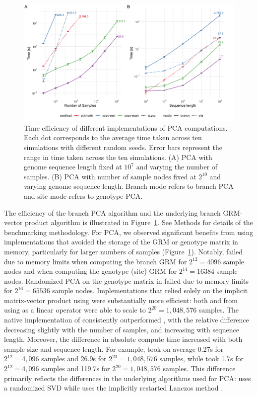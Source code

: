 \begin{figure}
    \centering
    \includegraphics[width=\textwidth]{Figures/Fig2_benchmarking_plot.png}
    \caption{Time efficiency of different implementations of PCA computations.
    Each dot corresponds to the average time taken across ten simulations with different random seeds.
    Error bars represent the range in time taken across the ten simulations.
    (A) PCA with genome sequence length fixed at $10^{7}$ and varying the number of samples.
    (B) PCA with number of sample nodes fixed at $2^{10}$ and varying genome sequence length.
    Branch mode refers to branch PCA and site mode refers to genotype PCA.
    \label{fig:benchmarking}}
\end{figure}

The efficiency of the branch PCA algorithm
and the underlying branch GRM-vector product algorithm is illustrated in
Figure~\ref{fig:benchmarking}. 
See Methods for details of the benchmarking methodology.
For PCA, we observed significant benefits from using implementations that avoided the storage of the GRM or genotype matrix in memory,
particularly for larger numbers of samples (Figure~\ref{fig:benchmarking}).
%
Notably, \tsGRM{} failed due to memory limits
when computing the branch GRM for $2^{12} = 4096$ sample nodes and
when computing the genotype (site) GRM for $2^{14} = 16384$ sample nodes.
%
Randomized PCA on the genotype matrix in \scikitallel{}
failed due to memory limits for $2^{16} = 65536$ sample nodes.
%
Implementations that relied solely on
the implicit matrix-vector product using \tskit{} were substantially more efficient:
%
both \tsPCA{} and \eigsh{} from \scipy{} using \tsGRMv{}
as a linear operator were able to scale to $2^{20} = 1,048,576$ samples.
%
The native implementation of \tsPCA{} consistently outperformed \eigsh{},
with the relative difference decreasing slightly with the number of samples, and increasing with sequence length.
%
Moreover, the difference in absolute compute time increased with both sample size and sequence length.
%
For example, \tsPCA{} took on average
0.27s for $2^{12} = 4,096$ samples and
26.9s for $2^{20} = 1,048,576$ samples,
while \eigsh{} took
  1.7s for $2^{12} = 4,096$ samples and
119.7s for $2^{20} = 1,048,576$ samples.
%
This difference primarily reflects the differences in the underlying algorithms used for PCA:
\tsPCA{} uses a randomized SVD while
\eigsh{} uses the implicitly restarted Lanczos method \citep{lehoucq1998arpack}.